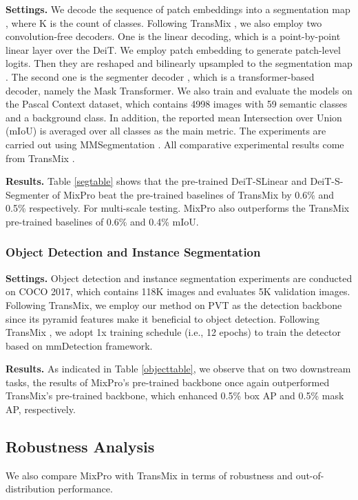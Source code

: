 \documentclass{article} \usepackage{iclr2023_conference,times}
\begin{document}
\textbf{Settings.} 
We decode the sequence of patch embeddings  into a segmentation map , where K is the count of classes. Following TransMix \citep{chen2021transmix}, we also employ two convolution-free decoders. One is the linear decoding, which is a point-by-point linear layer over the DeiT. We employ patch embedding  to generate patch-level logits. Then they are reshaped and bilinearly upsampled to the segmentation map . The second one is the segmenter decoder \citep{strudel2021segmenter}, which is a transformer-based decoder, namely the Mask Transformer. We also train and evaluate the models on the Pascal Context \citep{mottaghi2014pascal} dataset, which contains 4998 images with 59 semantic classes and a background class. In addition, the reported mean Intersection over Union (mIoU) is averaged over all classes as the main metric. The experiments are carried out using MMSegmentation \citep{contributors2020mmsegmentation}. All comparative experimental results come from TransMix \citep{chen2021transmix}.

\textbf{Results.} Table \ref{segtable} shows that the pre-trained DeiT-SLinear and DeiT-S-Segmenter of MixPro beat the pre-trained baselines of TransMix by 0.6\% and 0.5\% respectively. For multi-scale testing. MixPro also outperforms the TransMix pre-trained baselines of 0.6\% and 0.4\% mIoU.


\subsubsection{Object Detection and Instance Segmentation} 

\textbf{Settings.} Object detection and instance segmentation experiments are conducted on COCO 2017, which contains 118K images and evaluates 5K validation images. Following TransMix, we employ our method on PVT \citep{pyramidViTs} as the detection backbone since its pyramid features make it beneficial to object detection. Following TransMix \citep{chen2021transmix}, we adopt 1x training schedule (i.e., 12 epochs) to train the detector based on  mmDetection \citep{chen2019mmdetection} framework. 

\textbf{Results.} As indicated in Table \ref{objecttable}, we observe that on two downstream tasks, the results of MixPro's pre-trained backbone once again outperformed TransMix's pre-trained backbone, which enhanced 0.5\% box AP and 0.5\% mask AP, respectively. 


\subsection{Robustness Analysis}
\label{secRob}
We also compare MixPro with TransMix in terms of robustness and out-of-distribution performance.
    
\end{document}
